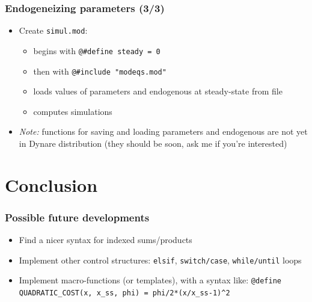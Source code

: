 \documentclass{beamer}
\begin{document}
\begin{frame}[fragile=singleslide]
  \frametitle{Endogeneizing parameters (3/3)}
  \begin{itemize}
  \item Create \texttt{simul.mod}:
    \begin{itemize}
    \item begins with \verb+@#define steady = 0+
    \item then with \verb+@#include "modeqs.mod"+
    \item loads values of parameters and endogenous at steady-state from file
    \item computes simulations
    \end{itemize}
  \item \textit{Note:} functions for saving and loading parameters and endogenous are not yet in Dynare distribution (they should be soon, ask me if you're interested)
  \end{itemize}
\end{frame}


\section{Conclusion}

\begin{frame}[fragile=singleslide]
  \frametitle{Possible future developments}
  \begin{itemize}
  \item Find a nicer syntax for indexed sums/products
  \item Implement other control structures: \texttt{elsif}, \texttt{switch/case}, \texttt{while/until} loops
  \item Implement macro-functions (or templates), with a syntax like:
    \small
    \verb+@define QUADRATIC_COST(x, x_ss, phi) = phi/2*(x/x_ss-1)^2+
    \normalsize
  \end{itemize}
\end{frame}
\end{document}
